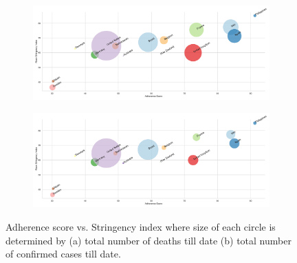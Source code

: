 \documentclass[preprint,authoryear,12pt]{elsarticle}
\begin{document}
    \begin{figure}
    	\centering
    	\begin{subfigure}[b]{\textwidth}
    		\centering
    		\includegraphics[width=0.7\linewidth]{score_death}
    	\end{subfigure}
    	
    	\begin{subfigure}[b]{\textwidth}
    		\centering
    		\includegraphics[width=0.7\linewidth]{score_confirmed}
    	\end{subfigure}
    	
    	\caption[Mobility Trends]{Adherence score vs. Stringency index where size of each circle is determined by (a) total number of deaths till date (b) total number of confirmed cases till date.}
    	\label{fig3} 
    \end{figure}
\end{document}
